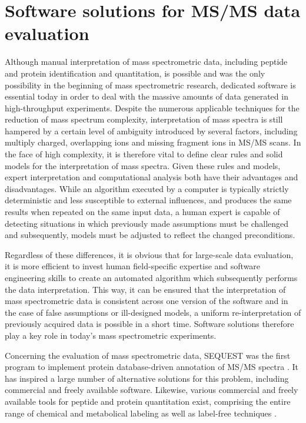 \section{Software solutions for MS/MS data evaluation}

Although manual interpretation of mass spectrometric data, including
peptide and protein identification and quantitation, is possible and was
the only possibility in the beginning of mass spectrometric research, dedicated 
software is essential today in order to deal with the massive amounts of data
generated in high-throughput experiments.
Despite the numerous applicable techniques for the reduction of mass spectrum
complexity, interpretation of mass spectra is still hampered by a certain
level of ambiguity introduced by several factors, including multiply charged, 
overlapping ions and missing fragment ions in MS/MS scans.
In the face of high complexity, it is therefore vital to define clear
rules and solid models for the interpretation of mass spectra.
Given these rules and models, expert interpretation and computational 
analysis both have their advantages and disadvantages.
While an algorithm executed by a computer is typically strictly deterministic 
and less susceptible to external influences, and produces the same results
when repeated on the same input data, a human expert is capable of detecting 
situations in which previously made assumptions must be challenged and 
subsequently, models must be adjusted to reflect the changed preconditions.

Regardless of these differences, it is obvious that for large-scale data
evaluation, it is more efficient to invest human field-specific expertise and
software engineering skills to create an automated algorithm which subsequently
performs the data interpretation.
This way, it can be ensured that the interpretation of mass spectrometric data 
is consistent across one version of the software and in the case of false
assumptions or ill-designed models, a uniform re-interpretation of previously
acquired data is possible in a short time.
Software solutions therefore play a key role in today's mass spectrometric 
experiments.

Concerning the evaluation of mass spectrometric data, SEQUEST was the first
program to implement protein database-driven annotation of MS/MS spectra 
\citep{Eng1994}.
It has inspired a large number of alternative solutions for this problem,
including commercial and freely available software.
Likewise, various commercial and freely available tools for peptide and
protein quantitation exist, comprising the entire range of chemical and 
metabolical labeling as well as label-free techniques \citep{Vaudel2010}.

